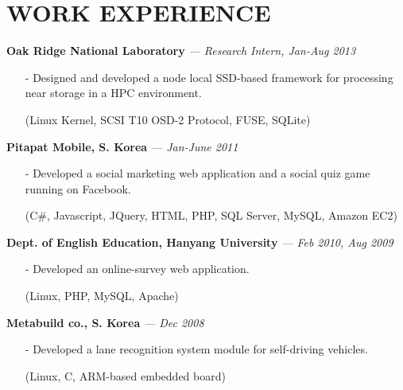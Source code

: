 \section{WORK EXPERIENCE} 
\vspace{0.07in} 
{\bf Oak Ridge National Laboratory}
{\it \footnotesize --- Research Intern, Jan-Aug 2013}
\begin{itemize}[leftmargin=*]
\setlength\itemsep{-0.02in}
 \item[-] Designed and developed a node local SSD-based framework for processing near
  storage in a HPC environment.
 \item[] {\small(Linux Kernel, SCSI T10 OSD-2 Protocol, FUSE, SQLite)}
\end{itemize}
\vspace{-0.15in}
{\bf Pitapat Mobile, S. Korea}
{\it \footnotesize --- Jan-June 2011}
\begin{itemize}[leftmargin=*]
\setlength\itemsep{-0.02in}
 \item[-] Developed a social marketing web application and a social quiz game running on
  Facebook.
 \item[] {\small(C\#, Javascript, JQuery, HTML, PHP, SQL Server, MySQL, Amazon EC2)}
\end{itemize}
\vspace{-0.15in}

{\bf Dept. of English Education, Hanyang University}
{\it \footnotesize --- Feb 2010, Aug 2009}
\begin{itemize}[leftmargin=*]
\setlength\itemsep{-0.02in}
 \item[-] Developed an online-survey web application.
 \item[] {\small(Linux, PHP, MySQL, Apache)}
\end{itemize}
\vspace{-0.15in}

{\bf Metabuild co., S. Korea}
{\it \footnotesize --- Dec 2008}
\begin{itemize}[leftmargin=*]
\setlength\itemsep{-0.02in}
 \item[-] Developed a lane recognition system module for self-driving vehicles.
 \item[] {\small(Linux, C, ARM-based embedded board)}
\end{itemize}

